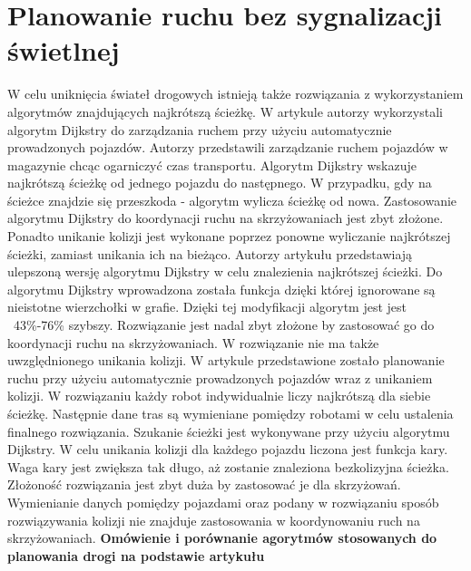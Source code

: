 \section{Planowanie ruchu bez sygnalizacji świetlnej}

\indent
W celu uniknięcia świateł drogowych istnieją także rozwiązania z wykorzystaniem algorytmów znajdujących najkrótszą ścieżkę. W artykule \cite{shaikh2013agv} autorzy wykorzystali algorytm Dijkstry do zarządzania ruchem przy użyciu automatycznie prowadzonych pojazdów. Autorzy przedstawili zarządzanie ruchem pojazdów w magazynie chcąc ogarniczyć czas transportu. Algorytm Dijkstry wskazuje najkrótszą ścieżkę od jednego pojazdu do następnego. W przypadku, gdy na ścieżce znajdzie się przeszkoda - algorytm wylicza ścieżkę od nowa. Zastosowanie algorytmu Dijkstry do koordynacji ruchu na skrzyżowaniach jest zbyt złożone. Ponadto unikanie kolizji jest wykonane poprzez ponowne wyliczanie najkrótszej ścieżki, zamiast unikania ich na bieżąco.
\newline
\indent
Autorzy artykułu \cite{huang2013improved} przedstawiają ulepszoną wersję algorytmu Dijkstry w celu znalezienia najkrótszej ścieżki. Do algorytmu Dijkstry wprowadzona została funkcja dzięki której ignorowane są nieistotne wierzchołki w grafie. Dzięki tej modyfikacji algorytm jest jest ~43\%-76\% szybszy. Rozwiązanie jest nadal zbyt złożone by zastosować go do koordynacji ruchu na skrzyżowaniach. W rozwiązanie nie ma także uwzględnionego unikania kolizji.
\newline
\indent
W artykule \cite{ando2003autonomous} przedstawione zostało planowanie ruchu przy użyciu automatycznie prowadzonych pojazdów wraz z unikaniem kolizji. W rozwiązaniu każdy robot indywidualnie liczy najkrótszą dla siebie ścieżkę. Następnie dane tras są wymieniane pomiędzy robotami w celu ustalenia finalnego rozwiązania. Szukanie ścieżki jest wykonywane przy użyciu algorytmu Dijkstry. W celu unikania kolizji dla każdego pojazdu liczona jest funkcja kary. Waga kary jest zwiększa tak długo, aż zostanie znaleziona bezkolizyjna ścieżka. Złożoność rozwiązania jest zbyt duża by zastosować je dla skrzyżowań. Wymienianie danych pomiędzy pojazdami oraz podany w rozwiązaniu sposób rozwiązywania kolizji nie znajduje zastosowania w koordynowaniu ruch na skrzyżowaniach.
\newline
\newline
\textbf{Omówienie i porównanie agorytmów stosowanych do planowania drogi na podstawie artykułu ~\cite{delling2009engineering}}
  \newline

